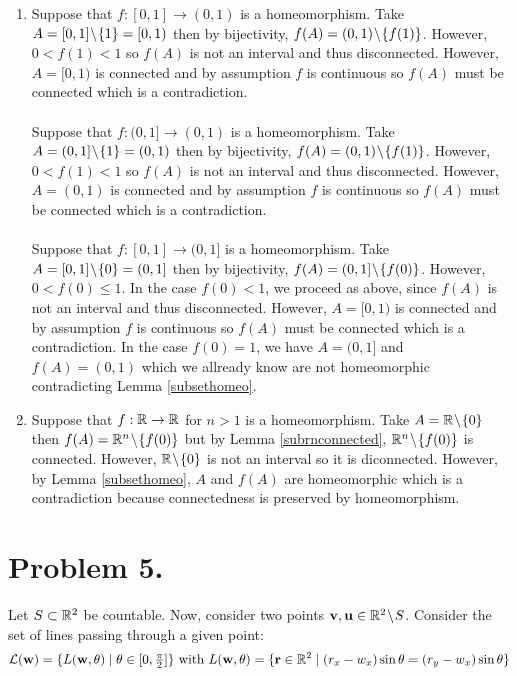 \documentclass[12pt]{extarticle}
\begin{document}
\begin{enumerate}
\item Suppose that $f : [0, 1] \to (0, 1)$ is a homeomorphism. Take $A = [0,1] \! \setminus \! \{1\} = [0, 1)$  then by bijectivity, $f(A) = (0, 1) \! \setminus \! \{f(1) \}$. However, $0 < f(1) < 1$ so $f(A)$ is not an interval and thus disconnected. However, $A = [0,1)$ is connected and by assumption $f$ is continuous so $f(A)$ must be connected which is a contradiction.  \\ \\
Suppose that $f : (0, 1] \to (0, 1)$ is a homeomorphism. Take $A = (0,1] \! \setminus \! \{1\} = (0, 1)$  then by bijectivity, $f(A) = (0, 1) \! \setminus \! \{f(1) \}$. However, $0 < f(1) < 1$ so $f(A)$ is not an interval and thus disconnected. However, $A = (0, 1)$ is connected and by assumption $f$ is continuous so $f(A)$ must be connected which is a contradiction.  \\ \\
Suppose that $f : [0, 1] \to (0, 1]$ is a homeomorphism. Take $A = [0,1] \! \setminus \! \{0\} = (0, 1]$  then by bijectivity, $f(A) = (0, 1] \! \setminus \! \{f(0) \}$. However, $0 < f(0) \le 1$. In the case $f(0) < 1$, we proceed as above, since $f(A)$ is not an interval and thus disconnected. However, $A = [0,1)$ is connected and by assumption $f$ is continuous so $f(A)$ must be connected which is a contradiction. In the case $f(0) = 1$, we have $A = (0, 1]$ and $f(A) = (0, 1)$ which we allready know are not homeomorphic contradicting Lemma \ref{subsethomeo}.

\item Suppose that $f : \mathbb{R} \to \mathbb{R}$ for $n > 1$ is a homeomorphism. Take $A = \mathbb{R} \! \setminus \! \{0 \}$ then $f(A) = \mathbb{R}^n \! \setminus \! \{f(0)\}$ but by Lemma \ref{subrnconnected}, $\mathbb{R}^n \! \setminus \! \{f(0)\}$ is connected. However, $\mathbb{R} \! \setminus \! \{0\}$ is not an interval so it is diconnected. However, by Lemma \ref{subsethomeo}, $A$ and $f(A)$ are homeomorphic which is a contradiction because connectedness is preserved by homeomorphism. 
\end{enumerate}

\section*{Problem 5.}

Let $S \subset \mathbb{R}^2$ be countable. Now, consider two points $\mathbf{v}, \mathbf{u} \in \mathbb{R}^2 \! \setminus \! S$. Consider the set of lines passing through a given point: \[\mathcal{L}(\mathbf{w}) = \{L(\mathbf{w}, \theta) \mid \theta \in [0, \tfrac{\pi}{2}] \} \text{ with } L(\mathbf{w}, \theta) = \{\mathbf{r} \in \mathbb{R}^2 \mid (r_x - w_x) \sin{\theta} = (r_y - w_x) \sin{\theta}  \}\]
\end{document}

